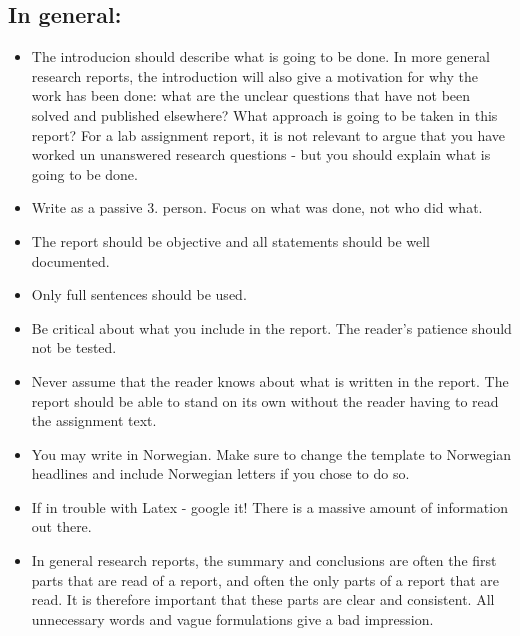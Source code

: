 \subsection*{In general: }
\begin{itemize}
\item The introducion should describe what is going to be done. In more general research reports, the introduction will also give a motivation for why the work has been done: what are the unclear questions that have not been solved and published elsewhere? What approach is going to be taken in this report? For a lab assignment report, it is not relevant to argue that you have worked un unanswered research questions - but you should explain what is going to be done.

\item Write as a passive 3. person. Focus on what was done, not who did what. 

\item The report should be objective and all statements should be well documented. 

\item Only full sentences should be used. 

\item Be critical about what you include in the report. The reader\textquoteright{}s patience should not be tested. 

\item Never assume that the reader knows about what is written in the report. The report should be able to stand on its own without the reader having to read the assignment text.  

\item You may write in Norwegian. Make sure to change the template to Norwegian headlines and include Norwegian letters if you chose to do so.

\item If in trouble with Latex - google it! There is a massive amount of information out there.

\item In general research reports, the summary and conclusions are often the first parts that are read of a report, and often the only parts of a report that are read. It is therefore important that these parts are clear and consistent. All unnecessary words and vague formulations give a bad impression. 


\end{itemize}